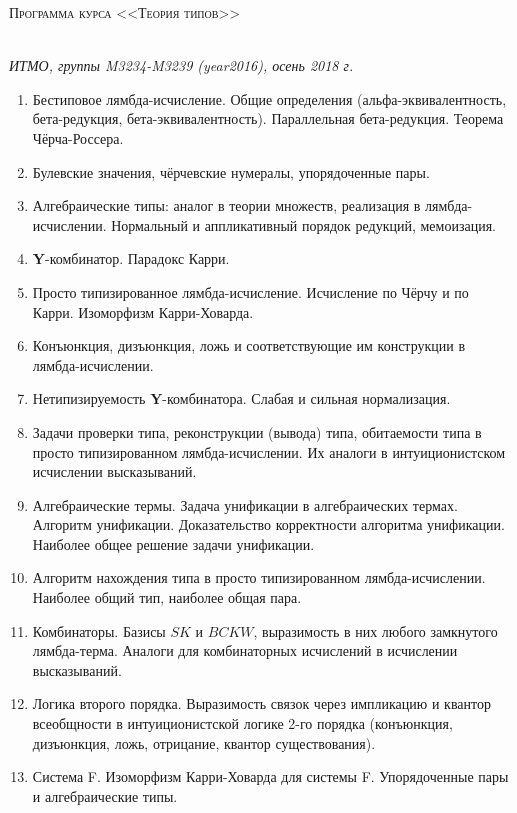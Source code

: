 \documentclass[11pt,a4paper,oneside]{book}
\begin{document}
\pagestyle{empty}

\begin{center}
\begin{Large}\scshape Программа курса <<Теория типов>>\end{Large}\\\vspace{0.1cm}
\textit{ИТМО, группы M3234-M3239 (year2016), осень 2018 г.}
\end{center}

\begin{enumerate}
\item Бестиповое лямбда-исчисление. Общие определения (альфа-эквивалентность, бета-редукция, 
бета-эк\-ви\-ва\-лент\-ность).
Параллельная бета-редукция. Теорема Чёрча-Россера.
\item Булевские значения, чёрчевские нумералы, упорядоченные пары.
\item Алгебраические типы: аналог в теории множеств, реализация в лямбда-исчислении. 
Нормальный и аппликативный порядок редукций, мемоизация.
\item \textbf{Y}-комбинатор. Парадокс Карри.
\item Просто типизированное лямбда-исчисление. Исчисление по Чёрчу и по Карри. Изоморфизм Карри-Ховарда.
\item Конъюнкция, дизъюнкция, ложь и соответствующие им конструкции в лямбда-исчислении.
\item Нетипизируемость \textbf{Y}-комбинатора. Слабая и сильная нормализация.
\item Задачи проверки типа, реконструкции (вывода) типа, обитаемости типа в просто типизированном лямбда-исчислении.
Их аналоги в интуиционистском исчислении высказываний.
\item Алгебраические термы. Задача унификации в алгебраических термах. Алгоритм унификации. Доказательство 
корректности алгоритма унификации. Наиболее общее решение задачи унификации.
\item Алгоритм нахождения типа в просто типизированном лямбда-исчислении. Наиболее общий тип, наиболее общая пара.
\item Комбинаторы. Базисы $SK$ и $BCKW$, выразимость в них любого замкнутого лямбда-терма.
Аналоги для комбинаторных исчислений в исчислении высказываний.
\item Логика второго порядка. Выразимость связок через импликацию и квантор всеобщности в интуиционистской логике 
2-го порядка (конъюнкция, дизъюнкция, ложь, отрицание, квантор существования).
\item Система F. Изоморфизм Карри-Ховарда для системы F. Упорядоченные пары и алгебраические типы.

\end{enumerate}
\end{document}
